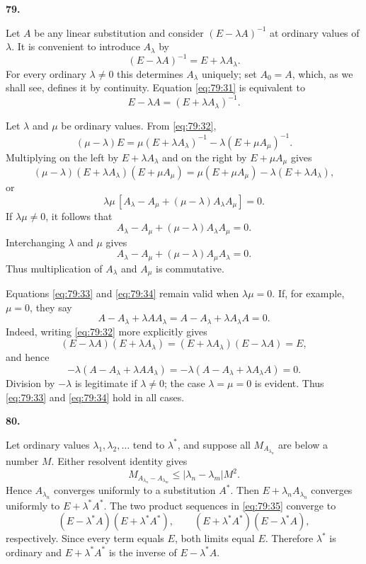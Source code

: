 \documentclass[
  paper=b5,
  fontsize=13pt,
  twoside=true,
  open=any,
  bookmarkpackage=false,
  chapterprefix=true,
  headings=normal
]{scrbook}
\theoremstyle{definition}
\newcommand{\numberedparagraph}[1]{%
  \par\medskip\phantomsection\label{sec:#1}%
  \noindent\textbf{#1.}\enspace
}
\begin{document}
\numberedparagraph{79}
Let $A$ be any linear substitution and consider $(E-\lambda A)^{-1}$ at
ordinary values of $\lambda$. It is convenient to introduce $A_\lambda$
by
\begin{equation}
  (E-\lambda A)^{-1}=E+\lambda A_\lambda.
  \tag{31}\label{eq:79:31}
\end{equation}
For every ordinary $\lambda\neq0$ this determines $A_\lambda$ uniquely; set
$A_0=A$, which, as we shall see, defines it by continuity. Equation
\eqref{eq:79:31} is equivalent to
\begin{equation}
  E-\lambda A=(E+\lambda A_\lambda)^{-1}.
  \tag{32}\label{eq:79:32}
\end{equation}

Let $\lambda$ and $\mu$ be ordinary values. From \eqref{eq:79:32},
\[
 (\mu-\lambda)E
 =\mu(E+\lambda A_\lambda)^{-1}
 -\lambda(E+\mu A_\mu)^{-1}.
\]
Multiplying on the left by $E+\lambda A_\lambda$ and on the right by
$E+\mu A_\mu$ gives
\[
 (\mu-\lambda)(E+\lambda A_\lambda)(E+\mu A_\mu)
 =\mu(E+\mu A_\mu)-\lambda(E+\lambda A_\lambda),
\]
or
\[
 \lambda\mu\,[A_\lambda-A_\mu
 +(\mu-\lambda)A_\lambda A_\mu]=0.
\]
If $\lambda\mu\neq0$, it follows that
\begin{equation}
  A_\lambda-A_\mu+(\mu-\lambda)A_\lambda A_\mu=0.
  \tag{33}\label{eq:79:33}
\end{equation}
Interchanging $\lambda$ and $\mu$ gives
\begin{equation}
  A_\lambda-A_\mu+(\mu-\lambda)A_\mu A_\lambda=0.
  \tag{34}\label{eq:79:34}
\end{equation}
Thus multiplication of $A_\lambda$ and $A_\mu$ is commutative.

Equations \eqref{eq:79:33} and \eqref{eq:79:34} remain valid when
$\lambda\mu=0$. If, for example, $\mu=0$, they say
\[
 A-A_\lambda+\lambda AA_\lambda
 =A-A_\lambda+\lambda A_\lambda A=0.
\]
Indeed, writing \eqref{eq:79:32} more explicitly gives
\begin{equation}
 (E-\lambda A)(E+\lambda A_\lambda)
 =(E+\lambda A_\lambda)(E-\lambda A)=E,
 \tag{35}\label{eq:79:35}
\end{equation}
and hence
\[
 -\lambda(A-A_\lambda+\lambda AA_\lambda)
 =-\lambda(A-A_\lambda+\lambda A_\lambda A)=0.
\]
Division by $-\lambda$ is legitimate if $\lambda\neq0$; the case
$\lambda=\mu=0$ is evident. Thus \eqref{eq:79:33} and
\eqref{eq:79:34} hold in all cases.

\numberedparagraph{80}
Let ordinary values $\lambda_1,\lambda_2,\ldots$ tend to $\lambda^*$, and
suppose all $M_{A_{\lambda_n}}$ are below a number $M$. Either resolvent
identity gives
\[
  M_{A_{\lambda_n}-A_{\lambda_m}}
  \leq|\lambda_n-\lambda_m|M^2.
\]
Hence
$A_{\lambda_n}$ converges uniformly to a substitution $A^*$. Then
$E+\lambda_nA_{\lambda_n}$ converges uniformly to
$E+\lambda^*A^*$. The two product sequences in \eqref{eq:79:35} converge
to
\[
 (E-\lambda^*A)(E+\lambda^*A^*),
 \qquad
 (E+\lambda^*A^*)(E-\lambda^*A),
\]
respectively. Since every term equals $E$, both limits equal $E$.
Therefore $\lambda^*$ is ordinary and $E+\lambda^*A^*$ is the inverse of
$E-\lambda^*A$.
\end{document}
